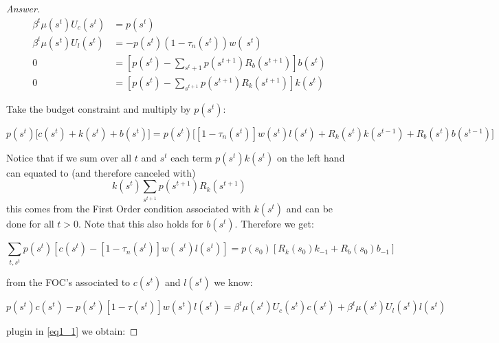 \documentclass[12pt]{article}
\theoremstyle{definition}
\begin{document}
\begin{proof}[Answer]
\begin{align*}
\beta^{ {t}} \mu\left( {s}^{ {t}}\right)  {U}_{ {c}}\left( {s}^{ {t}}\right)&= {p}\left( {s}^{ {t}}\right) \\
\beta^{ {t}} \mu\left( {s}^{ {t}}\right)  {U}_{ {l}}\left( {s}^{ {t}}\right)&=- {p}\left( {s}^{ {t}}\right)\left(1-\tau_n\left( {s}^{ {t}}\right)\right) w\left( {~s}^{ {t}}\right) \\
0&=\left[p\left(s^{t}\right)-\sum_{s^{t}+1} p\left(s^{t+1}\right) R_{b}\left(s^{t+1}\right)\right] b\left(s^{t}\right) \\
0&=\left[p\left(s^{t}\right)-\sum_{s^{t+1}} p\left(s^{t+1}\right) R_{k}\left(s^{t+1}\right)\right] k\left(s^{t}\right)
\end{align*}


Take the budget constraint and multiply by $p(s^t):$

$$
 p(s^t)\Big[c\left( s^{t}\right)+k\left(s^{t}\right)+b\left(s^{t}\right)\Big] =p(s^t)\Big[\left[1-\tau_n\left(s^{t}\right)\right] w\left(s^{t}\right) l\left(s^{t}\right)+R_{k}\left(s^{t}\right) k\left(s^{t-1}\right)+R_{b}\left(s^{t}\right) b\left(s^{t-1}\right)\Big]
$$

Notice that if we sum over all $t$ and $s^t$ each term $p(s^t)k(s^t)$ on the left hand can equated to (and therefore canceled with) $$k\left(s^{t}\right) \sum_{s^{t+1}}p\left(s^{t+1}\right) R_{k}\left(s^{t+1}\right)$$
this comes from the First Order condition associated with $k(s^t)$ and can be done for all $t>0$. Note that this also holds for $b(s^t)$. Therefore we get:

    \begin{equation}\label{eq1_1}
    \sum_{ {t},  {s}^{ {t}}}  {p}\left( {s}^{ {t}}\right)\left[ {c}\left( {s}^{ {t}}\right)-\left[1-\tau_n\left( {s}^{ {t}}\right)\right] w\left( {~s}^{ {t}}\right)  {l}\left( {s}^{ {t}}\right)\right]= {p}\left( {s}_{0}\right)\left[ {R}_{ {k}}\left( {s}_{0}\right)  {k}_{-1}+ {R}_{ {b}}\left( {s}_{0}\right)  {b}_{-1}\right]
    \end{equation}

from the FOC's associated to $c(s^t)$ and $l(s^t)$ we know:

$$p(s^t)c(s^t) - p(s^t)[1-\tau(s^t)]w(s^t)l(s^t)  =  \beta^{ {t}} \mu\left( {s}^{ {t}}\right) {U}_{ {c}}\left( {s}^{ {t}}\right)  {c}\left( {s}^{ {t}}\right)+ \beta^{ {t}} \mu\left( {s}^{ {t}}\right){U}_{ {l}}\left( {s}^{ {t}}\right)  {l}\left( {s}^{ {t}}\right) $$

plugin in \eqref{eq1_1} we obtain:


\end{proof}
\end{document}
